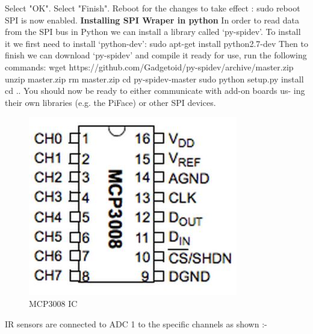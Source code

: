 \documentclass[11pt,a4paper]{report}
\begin{document}
\begin{flushleft}
Select "OK".\newline
 \newline
	   Select "Finish".\newline
	 \newline
	    Reboot for the changes to take effect :\newline
sudo reboot\newline
SPI is now enabled.\vspace{0.9cm}\newline
\textbf{Installing SPI Wraper in python }\vspace{0.2cm}\newline
In order to read data from the SPI bus in Python we can install a library
called `py-spidev'. To install it we first need to install `python-dev':
sudo apt-get install python2.7-dev
Then to finish we can download `py-spidev' and compile it ready for use,
run the following commands:
wget https://github.com/Gadgetoid/py-spidev/archive/master.zip
unzip master.zip
rm master.zip
cd py-spidev-master
sudo python setup.py install
cd ..
You should now be ready to either communicate with add-on boards us-
ing their own libraries (e.g. the PiFace) or other SPI devices.
	\vspace{0.2cm}
	\newline
	

	 \begin{figure}[h!]
		\includegraphics[scale=0.7]{mcp.jpg}
		\centering
		\caption{MCP3008 IC}
	    \end{figure}
	
	IR sensors are connected to ADC 1  to the specific channels as shown :-
		\vspace{0.3cm}
	
	\centering
	\begin{tabular}{ |p{3cm}|p{3cm}| }
	


\end{tabular}
\end{flushleft}
\end{document}
